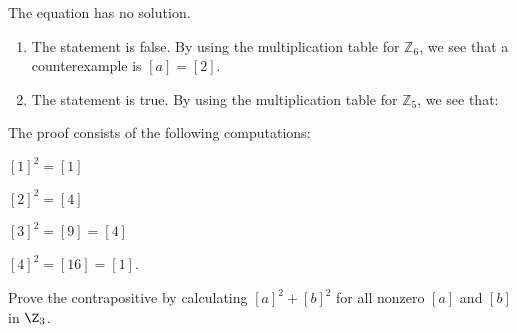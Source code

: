 \begin{list}{}
\item \begin{list}{\bf{(g)}}
\item The equation has no solution.
\end{list}
\end{list}

\begin{list}{\bf{\ref{exer:sec74-4}.}}
\item \begin{enumerate}
\item The statement is false.  By using the multiplication table for $\mathbb{Z}_6$, we see that a counterexample is $\left[ a \right] = \left[ 2 \right]$.

\item The statement is true.  By using the multiplication table for $\mathbb{Z}_5$, we see that:

\begin{multicols}{2}
\end{multicols}
\end{enumerate}
\end{list}





\begin{list}{\bf{\ref{exer:squaresinZ5}.}}
\item \begin{list}{\bf{(a)}}
\item The proof consists of the following computations:
\begin{multicols}{2}
\begin{list}{}
\item $[ 1 ]^2 = [ 1 ]$
\item $[ 2 ]^2 = [ 4 ]$
\item $[ 3 ]^2 = [ 9 ] = [ 4 ]$
\item $[ 4 ]^2 = [ 16 ] = [ 1 ]$.
\end{list}
\end{multicols}
\end{list}
\end{list}


\begin{list}{\bf{\ref{exer:sec74cong3}.}}
\item \begin{list}{\bf{(a)}}
\item Prove the contrapositive by calculating $[ a ]^2 + [ b ]^2$ for all nonzero $[ a ]$ and $[ b ]$ in $\Z_3$.
\end{list}
\end{list}
\hbreak
\endinput



